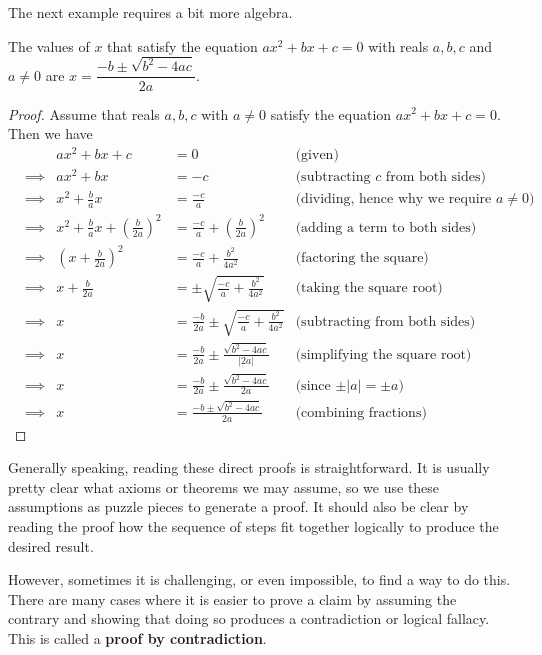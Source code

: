 The next example requires a bit more algebra.
\begin{theorem}
    The values of $x$ that satisfy the equation $ax^2+bx+c=0$ with reals $a,b,c$ and $a\neq 0$ are $x=\dfrac{-b\pm\sqrt{b^2 - 4ac}}{2a}$.
\end{theorem}

\begin{proof}
    Assume that reals $a,b,c$ with $a\neq 0$ satisfy the equation $ax^2+bx+c=0$. Then we have
    \begin{align*}
        & & ax^2+bx+c &= 0 &\text{(given)}\\
        &\implies & ax^2+bx &= -c &\text{(subtracting $c$ from both sides)}\\
        &\implies & x^2 + \frac{b}{a}x &= \frac{-c}{a} &\text{(dividing, hence why we require $a\neq 0$)}\\
        &\implies & x^2 + \frac{b}{a}x + \left(\frac{b}{2a}\right)^2 &= \frac{-c}{a} + \left(\frac{b}{2a}\right)^2 &\text{(adding a term to both sides)}\\
        &\implies & \left(x + \frac{b}{2a}\right)^2 &= \frac{-c}{a} + \frac{b^2}{4a^2} &\text{(factoring the square)}\\
        &\implies & x + \frac{b}{2a} &= \pm\sqrt{\frac{-c}{a} + \frac{b^2}{4a^2}} &\text{(taking the square root)}\\
        &\implies & x &= \frac{-b}{2a} \pm\sqrt{\frac{-c}{a} + \frac{b^2}{4a^2}} &\text{(subtracting from both sides)}\\
        &\implies & x &= \frac{-b}{2a}\pm \frac{\sqrt{b^2-4ac}}{|2a|} &\text{(simplifying the square root)}\\
         &\implies & x &= \frac{-b}{2a}\pm \frac{\sqrt{b^2-4ac}}{2a} &\text{(since $\pm|a|=\pm a$)}\\
        &\implies & x &= \frac{-b\pm\sqrt{b^2 - 4ac}}{2a} &\text{(combining fractions)}
    \end{align*}
\end{proof}

Generally speaking, reading these direct proofs is straightforward. It is usually pretty clear what axioms or theorems we may assume, so we use these assumptions as puzzle pieces to generate a proof. It should also be clear by reading the proof how the sequence of steps fit together logically to produce the desired result. \par


\clearpage
However, sometimes it is challenging, or even impossible, to find a way to do this. There are many cases where it is easier to prove a claim by assuming the contrary and showing that doing so produces a contradiction or logical fallacy. This is called a \textbf{proof by contradiction}. \par

